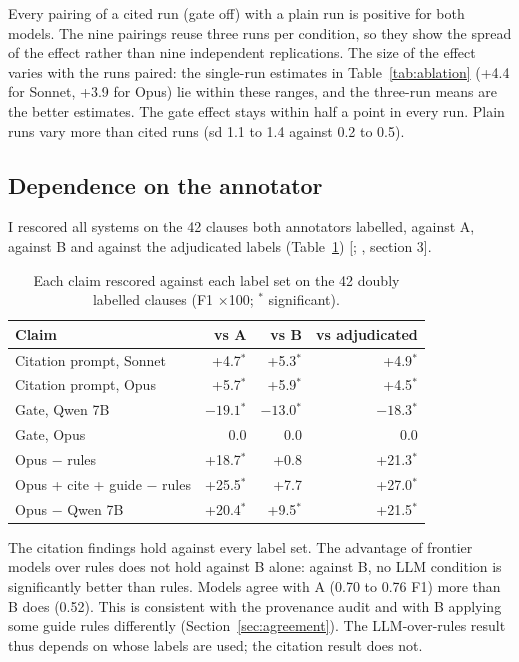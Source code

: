 \documentclass[11pt,a4paper]{article}
\newcommand{\sig}{$^{*}$}
\begin{document}
Every pairing of a cited run (gate off) with a plain run is positive for both models. The nine pairings reuse three runs per condition, so they show the spread of the effect rather than nine independent replications. The size of the effect varies with the runs paired: the single-run estimates in Table~\ref{tab:ablation} (+4.4 for Sonnet, +3.9 for Opus) lie within these ranges, and the three-run means are the better estimates. The gate effect stays within half a point in every run. Plain runs vary more than cited runs (sd 1.1 to 1.4 against 0.2 to 0.5).

\subsection{Dependence on the annotator}\label{sec:annotator}

I rescored all systems on the 42 clauses both annotators labelled, against A, against B and against the adjudicated labels (Table~\ref{tab:annotator}) {\small[; , section 3]}.

\begin{table}[h]
\centering
\begin{tabular}{lrrr}
\toprule
Claim & vs A & vs B & vs adjudicated \\
\midrule
Citation prompt, Sonnet & +4.7\sig & +5.3\sig & +4.9\sig \\
Citation prompt, Opus & +5.7\sig & +5.9\sig & +4.5\sig \\
Gate, Qwen 7B & $-19.1$\sig & $-13.0$\sig & $-18.3$\sig \\
Gate, Opus & 0.0 & 0.0 & 0.0 \\
Opus $-$ rules & +18.7\sig & +0.8 & +21.3\sig \\
Opus + cite + guide $-$ rules & +25.5\sig & +7.7 & +27.0\sig \\
Opus $-$ Qwen 7B & +20.4\sig & +9.5\sig & +21.5\sig \\
\bottomrule
\end{tabular}
\caption{Each claim rescored against each label set on the 42 doubly labelled clauses (F1 $\times$100; \sig{} significant).}
\label{tab:annotator}
\end{table}

The citation findings hold against every label set. The advantage of frontier models over rules does not hold against B alone: against B, no LLM condition is significantly better than rules. Models agree with A (0.70 to 0.76 F1) more than B does (0.52). This is consistent with the provenance audit and with B applying some guide rules differently (Section~\ref{sec:agreement}). The LLM-over-rules result thus depends on whose labels are used; the citation result does not.
\end{document}
